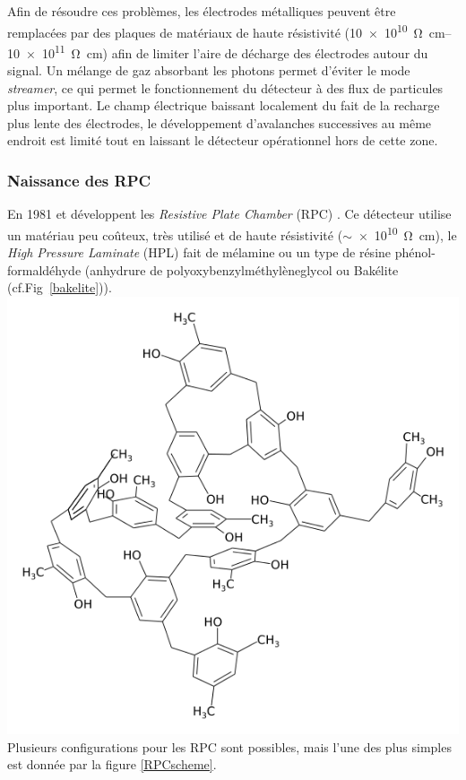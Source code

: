 Afin de résoudre ces problèmes, les électrodes métalliques peuvent être remplacées par des plaques de matériaux de haute résistivité (\SIrange{10e10}{10e11}{\ohm\centi\meter}) afin de limiter l'aire de décharge des électrodes autour du signal. Un mélange de gaz absorbant les photons permet d'éviter le mode \textit{streamer}, ce qui permet le fonctionnement du détecteur à des flux de particules plus important. Le champ électrique baissant localement du fait de la recharge plus lente des électrodes, le développement d'avalanches successives au même endroit est limité tout en laissant le détecteur opérationnel hors de cette zone.
\vspace{-0.4cm}
\subsubsection{Naissance des RPC}
\vspace{-0.4cm}
En \num{1981}  et  développent les \textit{Resistive Plate Chamber} (RPC) \cite{Santonico:1981sc} \cite{CARDARELLI198820}. Ce détecteur utilise un matériau peu coûteux, très utilisé et de haute résistivité ($\sim$\SI{e10}{\ohm\centi\meter}), le \textit{High Pressure Laminate} (HPL) fait de mélamine ou un type de résine phénol-formaldéhyde (anhydrure de polyoxybenzylméthylèneglycol ou Bakélite (cf.Fig~\ref{bakelite})). 
\marginpar
{
	\centering
	\includegraphics[width=\marginparwidth]{RPC/bakelite.png}
	\label{bakelite}
}
Plusieurs configurations pour les RPC sont possibles, mais l'une des plus simples est donnée par la figure \ref{RPCscheme}.

